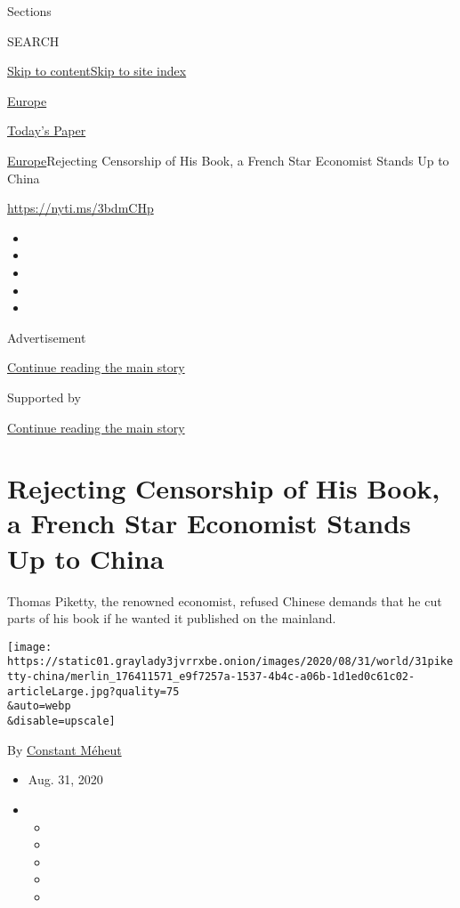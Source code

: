 Sections

SEARCH

\protect\hyperlink{site-content}{Skip to
content}\protect\hyperlink{site-index}{Skip to site index}

\href{https://www.nytimes3xbfgragh.onion/section/world/europe}{Europe}

\href{https://myaccount.nytimes3xbfgragh.onion/auth/login?response_type=cookie\&client_id=vi}{}

\href{https://www.nytimes3xbfgragh.onion/section/todayspaper}{Today's
Paper}

\href{/section/world/europe}{Europe}\textbar{}Rejecting Censorship of
His Book, a French Star Economist Stands Up to China

\url{https://nyti.ms/3bdmCHp}

\begin{itemize}
\item
\item
\item
\item
\item
\end{itemize}

Advertisement

\protect\hyperlink{after-top}{Continue reading the main story}

Supported by

\protect\hyperlink{after-sponsor}{Continue reading the main story}

\hypertarget{rejecting-censorship-of-his-book-a-french-star-economist-stands-up-to-china}{%
\section{Rejecting Censorship of His Book, a French Star Economist
Stands Up to
China}\label{rejecting-censorship-of-his-book-a-french-star-economist-stands-up-to-china}}

Thomas Piketty, the renowned economist, refused Chinese demands that he
cut parts of his book if he wanted it published on the mainland.

\texttt{[image: https://static01.graylady3jvrrxbe.onion/images/2020/08/31/world/31piketty-china/merlin\_176411571\_e9f7257a-1537-4b4c-a06b-1d1ed0c61c02-articleLarge.jpg?quality=75\\\&auto=webp\\\&disable=upscale]}

By \href{https://www.nytimes3xbfgragh.onion/by/constant-meheut}{Constant
Méheut}

\begin{itemize}
\item
  Aug. 31, 2020
\item
  \begin{itemize}
  \item
  \item
  \item
  \item
  \item
  \end{itemize}
\end{itemize}

